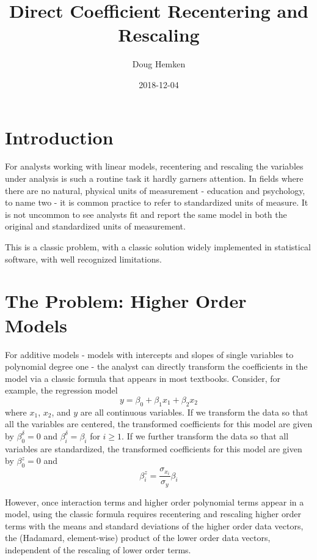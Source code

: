 \documentclass[]{article}
\title{Direct Coefficient Recentering and Rescaling}
\author{Doug Hemken}
\date{2018-12-04}
\begin{document}
\maketitle

{
\setcounter{tocdepth}{1}
\tableofcontents
}

\hypertarget{introduction}{%
\section{Introduction}\label{introduction}}

For analysts working with linear models, recentering and rescaling the
variables under analysis is such a routine task it hardly garners
attention. In fields where there are no natural, physical units of
measurement - education and psychology, to name two - it is common
practice to refer to standardized units of measure. It is not uncommon
to see analysts fit and report the same model in both the original and
standardized units of measurement.

This is a classic problem, with a classic solution widely implemented in
statistical software, with well recognized limitations.

\hypertarget{the-problem-higher-order-models}{%
\section{The Problem: Higher Order
Models}\label{the-problem-higher-order-models}}

For additive models - models with intercepts and slopes of single
variables to polynomial degree one - the analyst can directly transform
the coefficients in the model via a classic formula that appears in most
textbooks. Consider, for example, the regression model
\[y = \beta_0 + \beta_1x_1 + \beta_2x_2\] where \(x_1\), \(x_2\), and
\(y\) are all continuous variables. If we transform the data so that all
the variables are centered, the transformed coefficients for this model
are given by \(\beta_0^\delta=0\) and \(\beta_i^\delta=\beta_i\) for
\(i\ge 1\). If we further transform the data so that all variables are
standardized, the transformed coefficients for this model are given by
\(\beta_0^z=0\) and \[\beta_i^z=\frac{\sigma_{x_i}}{\sigma_y}\beta_i\]

However, once interaction terms and higher order polynomial terms appear
in a model, using the classic formula requires recentering and rescaling
higher order terms with the means and standard deviations of the higher
order data vectors, the (Hadamard, element-wise) product of the lower
order data vectors, independent of the rescaling of lower order terms.
\end{document}
